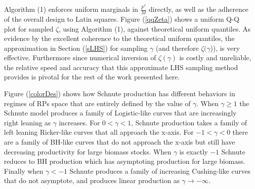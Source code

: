 %
Algorithm (1) enforces uniform marginals in $\frac{F^*}{M}$ directly, as well
as the adherence of the overall design to Latin squares.
Figure (\ref{qqZeta}) shows a uniform Q-Q plot for sampled $\zeta$, using
Algorithm (1), against theoretical uniform quantiles. As evidence by the
excellent coherence to the theoretical uniform quantiles, the approximation
in Section (\ref{sLHS}) for sampling $\gamma$ (and therefore $\zeta(\gamma$)),
is very effective.
Furthermore since numerical inversion of $\zeta(\gamma)$ is costly and
unreliable, the relative speed and accuracy that this approximate LHS sampling
method provides is pivotal for the rest of the work presented here. %

%
Figure (\ref{colorDes}) shows how Schnute production has different behaviors in regimes 
of RPs space that are entirely defined by the value of $\gamma$. %
When $\gamma\ge1$ the Schnute model produces a family of Logistic-like curves that are
increasingly right leaning as $\gamma$ increases.
For $0<\gamma<1$, Schnute production takes a family of left leaning Ricker-like curves
that all approach the x-axis. For $-1<\gamma<0$ there are a family of BH-like
curves that do not approach the x-axis but still have decreasing productivity for large
biomass stocks. When $\gamma$ is exactly $-1$ Schnute reduces to BH production which has
asymptoting production for large biomass. Finally when $\gamma<-1$ Schnute
produces a family of increasing Cushing-like curves that do not asymptote, and produces
linear production as $\gamma\to-\infty$.

